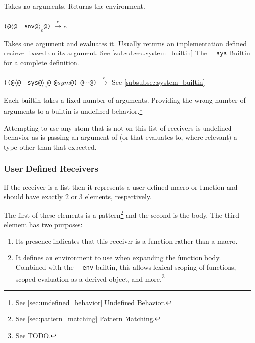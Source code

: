 \documentclass[twocolumn]{report}
\newcommand{\intralink}[2]{\hyperref[#1]{\ref*{#1} #2}}
\begin{document}
\begin{description}[leftmargin=1.5cm,labelwidth=1.3cm]
\item [\texttt{~~env}]
Takes no arguments.
Returns the environment. \\
\\
\texttt{(@$\langle$@~~env@$\rangle_{e}$@)} $\xrightarrow{e} e$

\item [\texttt{~~sys}]
Takes one argument and evaluates it.
Usually returns an implementation defined reciever based on its argument.
See \intralink{subsubsec:system_builtin}{The \texttt{~~sys} Builtin} for a complete definition. \\
\\
\texttt{((@$\langle$@~~sys@$\rangle_{e}$@ @$sym$@) @$\cdots$@)} $\xrightarrow{e}$ See \intralink{subsubsec:system_builtin}{}
\end{description}

Each builtin takes a fixed number of arguments.
Providing the wrong number of arguments to a builtin is undefined behavior.\footnote{See \intralink{sec:undefined_behavior}{Undefined Behavior}.}

Attempting to use any atom that is not on this list of receivers is undefined behavior as is passing an argument of (or that evaluates to, where relevant) a type other than that expected.

\subsubsection{User Defined Receivers}
\label{subsubsec:user_defined_recievers}

If the receiver is a list then it represents a user-defined macro or function and should have exactly $2$ or $3$ elements, respectively.

The first of these elements is a pattern\footnote{See \intralink{sec:pattern_matching}{Pattern Matching}.} and the second is the body.
The third element has two purposes:
\begin{enumerate}
\item Its presence indicates that this receiver is a function rather than a macro.
\item It defines an environment to use when expanding the function body.
Combined with the \texttt{~~env} builtin, this allows lexical scoping of functions, scoped evaluation as a derived object, and more.\footnote{See TODO.}
\end{enumerate}
\end{document}
